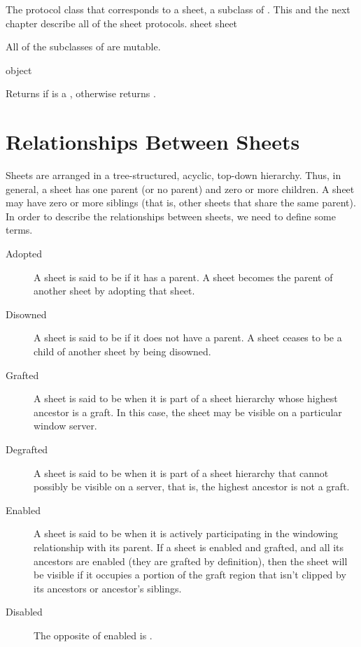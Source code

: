 
The protocol class that corresponds to a sheet, a subclass of
.  This and the next chapter describe all of the sheet
protocols.
 {sheet} {sheet}

All of the subclasses of  are mutable.

 {object}

Returns  if  is a , otherwise returns
.


\section {Relationships Between Sheets}

Sheets are arranged in a tree-structured, acyclic, top-down hierarchy.  Thus, in
general, a sheet has one parent (or no parent) and zero or more children.  A
sheet may have zero or more siblings (that is, other sheets that share the same
parent).  In order to describe the relationships between sheets, we need to
define some terms.

\begin{description}
\item [Adopted] A sheet is said to be  if it has a parent.  A
sheet becomes the parent of another sheet by adopting that sheet.

\item [Disowned] A sheet is said to be  if it does not have a
parent.  A sheet ceases to be a child of another sheet by being disowned.

\item [Grafted] A sheet is said to be  when it is part of a
sheet hierarchy whose highest ancestor is a graft.  In this case, the sheet may
be visible on a particular window server.

\item [Degrafted] A sheet is said to be  when it is part of a
sheet hierarchy that cannot possibly be visible on a server, that is, the
highest ancestor is not a graft.

\item [Enabled] A sheet is said to be  when it is actively
participating in the windowing relationship with its parent.  If a sheet is
enabled and grafted, and all its ancestors are enabled (they are grafted by
definition), then the sheet will be visible if it occupies a portion of the
graft region that isn't clipped by its ancestors or ancestor's siblings.

\item [Disabled] The opposite of enabled is .
\end{description}


